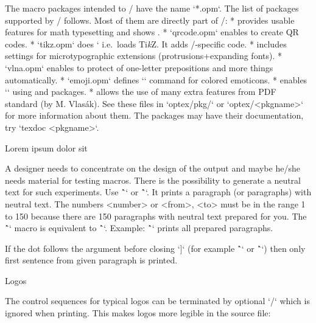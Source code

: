 {The macro packages intended to \OpTeX/ have the name `*.opm`.
The list of packages supported by \OpTeX/ follows. Most of them are directly part of \OpTeX/:
\begitems \typosize[9/11]
* 
  provides usable features for math typesetting and shows
  .
* `qrcode.opm` enables to create QR codes.
* `tikz.opm` does ` i.e.\ loads Ti{\it k\/}Z. It adds \OpTeX/-specific code.
* 
  includes settings for microtypographic extensions (protrusions+expanding fonts).
* `vlna.opm` enables to protect of one-letter prepositions and more things automatically.
* `emoji.opm` defines `` command for colored emoticons.
*  enables
  `\directmetapost` using 
  and  packages.
* 
  allows the use of many extra features from PDF standard (by M. Vlasák).
\enditems
See these files in `optex/pkg/` or `optex/<pkgname>` for more information about
them. The packages may have their documentation, try `texdoc <pkgname>`.

\secc Lorem ipsum dolor sit

\new
A designer needs to concentrate on the design of the output and maybe he/she
needs material for testing macros. There is the possibility to generate a
neutral text for such experiments. Use \^`\lorem[<number>]` or
\^`\lorem[<from>-<to>]`. It prints a paragraph (or paragraphs) with neutral
text. The numbers <number> or <from>, <to> must be in the range 1 to 150
because there are 150 paragraphs with neutral text prepared for you.
The \^`\lipsum` macro is equivalent to \^`\lorem`. Example: \^`\lipsum[1-150]`
prints all prepared paragraphs.

If the dot follows the argument before closing `]` (for example \^`\lipsum[3.]`
or \^`\lipsum[3.1]`)
then only first sentence from given paragraph is printed.

\secc Logos

\new
The control sequences for typical logos can be terminated by optional `/`
which is ignored when printing. This makes logos more legible in the source file:

}
